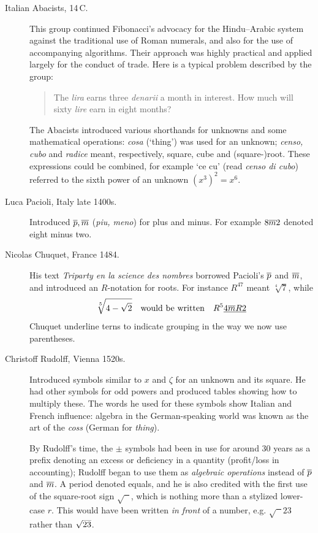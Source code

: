 \begin{description}
	\item[Italian Abacists, 14\th\,C.] This group continued Fibonacci's advocacy for the Hindu--Arabic system against the traditional use of Roman numerals, and also for the use of accompanying algorithms. Their approach was highly practical and applied largely for the conduct of trade. Here is a typical problem described by the group:
  \begin{quote}
  The \emph{lira} earns three \emph{denarii} a month in interest. How much will sixty \emph{lire} earn in eight months?
  \end{quote}
  The Abacists introduced various shorthands for unknowns and some mathematical operations: \emph{cosa} (`thing') was used for an unknown; \emph{censo, cubo} and \emph{radice} meant, respectively, square, cube and (square-)root. These expressions could be combined, for example `ce cu' (read \emph{censo di cubo}) referred to the sixth power of an unknown $(x^3)^2=x^6$.
  
  \item[Luca Pacioli, Italy late 1400s.] Introduced $\overline{p},\overline{m}$ (\emph{piu, meno}) for plus and minus. For example $8\overline{m} 2$ denoted eight minus two. 
  
  \item[Nicolas Chuquet, France 1484.] His text \emph{Triparty en la science des nombres} borrowed Pacioli's $\overline{p}$ and $\overline{m}$, and introduced an $R$-notation for roots. For instance $R^47$ meant $\sqrt[4]7$, while
  \[
  	\sqrt[5]{4-\sqrt 2}\quad\text{would be written}\quad R^5\underline{4\overline{m}R2}
  \]
  Chuquet underline terns to indicate grouping in the way we now use parentheses.
  
	\item[Christoff Rudolff, Vienna 1520s.] Introduced symbols similar to $x$ and $\zeta$ for an unknown and its square. He had other symbols for odd powers and produced tables showing how to multiply these. The words he used for these symbols show Italian and French influence: algebra in the German-speaking world was known as the art of the \emph{coss} (German for \emph{thing}).\par
	By Rudolff's time, the $\pm$ symbols had been in use for around 30 years as a prefix denoting an excess or deficiency in a quantity (profit/loss in accounting); Rudolff began to use them as \emph{algebraic operations} instead of $\overline{p}$ and $\overline{m}$. A period denoted equals, and he is also credited with the first use of the square-root sign $\sqrt{\phantom x\!\!}$, which is nothing more than a stylized lower-case $r$. This would have been written \emph{in front} of a number, e.g. $\sqrt{\phantom x\!\!}23$ rather than $\smash[t]{\sqrt{23}}$.
	

\end{description}
